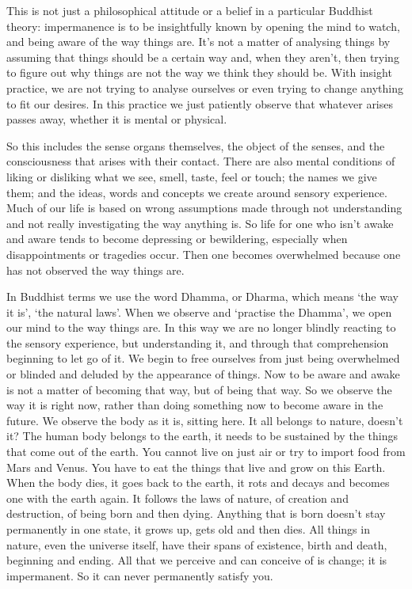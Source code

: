 This is not just a philosophical attitude or a belief in a particular Buddhist theory: impermanence is to be insightfully known by opening the mind to watch, and being aware of the way things are. It's not a matter of analysing things by assuming that things should be a certain way and, when they aren't, then trying to figure out why things are not the way we think they should be. With insight practice, we are not trying to analyse ourselves or even trying to change anything to fit our desires. In this practice we just patiently observe that whatever arises passes away, whether it is mental or physical.

So this includes the sense organs themselves, the object of the senses, and the consciousness that arises with their contact. There are also mental conditions of liking or disliking what we see, smell, taste, feel or touch; the names we give them; and the ideas, words and concepts we create around sensory experience. Much of our life is based on wrong assumptions made through not understanding and not really investigating the way anything is. So life for one who isn't awake and aware tends to become depressing or bewildering, especially when disappointments or tragedies occur. Then one becomes overwhelmed because one has not observed the way things are.

In Buddhist terms we use the word Dhamma, or Dharma, which means `the way it is', `the natural laws'. When we observe and `practise the Dhamma', we open our mind to the way things are. In this way we are no longer blindly reacting to the sensory experience, but understanding it, and through that comprehension beginning to let go of it. We begin to free ourselves from just being overwhelmed or blinded and deluded by the appearance of things. Now to be aware and awake is not a matter of becoming that way, but of being that way. So we observe the way it is right now, rather than doing something now to become aware in the future. We observe the body as it is, sitting here. It all belongs to nature, doesn't it? The human body belongs to the earth, it needs to be sustained by the things that come out of the earth. You cannot live on just air or try to import food from Mars and Venus. You have to eat the things that live and grow on this Earth. When the body dies, it goes back to the earth, it rots and decays and becomes one with the earth again. It follows the laws of nature, of creation and destruction, of being born and then dying. Anything that is born doesn't stay permanently in one state, it grows up, gets old and then dies. All things in nature, even the universe itself, have their spans of existence, birth and death, beginning and ending. All that we perceive and can conceive of is change; it is impermanent. So it can never permanently satisfy you.


